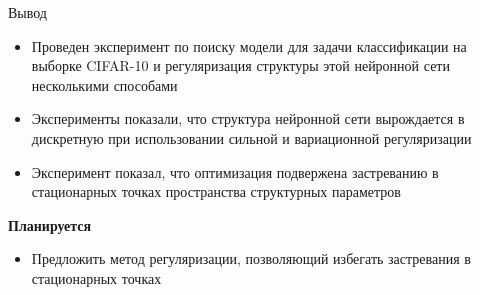 \documentclass[10pt]{beamer}
\begin{document}





\begin{frame}{Вывод}

\begin{itemize}
	\item Проведен эксперимент по поиску модели для задачи классификации на выборке CIFAR-10 и регуляризация структуры этой нейронной сети несколькими способами 
	\item Эксперименты показали, что структура нейронной сети вырождается в дискретную при использовании сильной и вариационной регуляризации
	\item Эксперимент показал, что оптимизация подвержена застреванию в стационарных точках пространства структурных параметров
\end{itemize}

{\bf Планируется}\\
	\begin{itemize}
		\item Предложить метод регуляризации, позволяющий избегать застревания в стационарных точках
	\end{itemize}

\end{frame}
\end{document}
